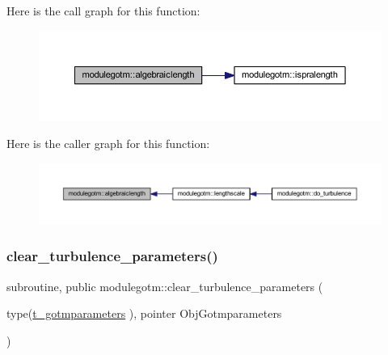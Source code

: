 Here is the call graph for this function\+:\nopagebreak
\begin{figure}[H]
\begin{center}
\leavevmode
\includegraphics[width=350pt]{namespacemodulegotm_a91db88191066626042c7b8aba8a116ab_cgraph}
\end{center}
\end{figure}
Here is the caller graph for this function\+:\nopagebreak
\begin{figure}[H]
\begin{center}
\leavevmode
\includegraphics[width=350pt]{namespacemodulegotm_a91db88191066626042c7b8aba8a116ab_icgraph}
\end{center}
\end{figure}
\mbox{\label{namespacemodulegotm_acc6ad2c4bea63b4d44a941b81fcbf402}} 
\subsubsection{\texorpdfstring{clear\+\_\+turbulence\+\_\+parameters()}{clear\_turbulence\_parameters()}}
{\footnotesize\ttfamily subroutine, public modulegotm\+::clear\+\_\+turbulence\+\_\+parameters (\begin{DoxyParamCaption}\item[{type(\mbox{\hyperlink{structmodulegotm_1_1t__gotmparameters}{t\+\_\+gotmparameters}} ), pointer}]{Obj\+Gotmparameters }\end{DoxyParamCaption})}

\mbox{\label{namespacemodulegotm_a8f3eabf069e4530d9ca2df0e3228c074}} 
